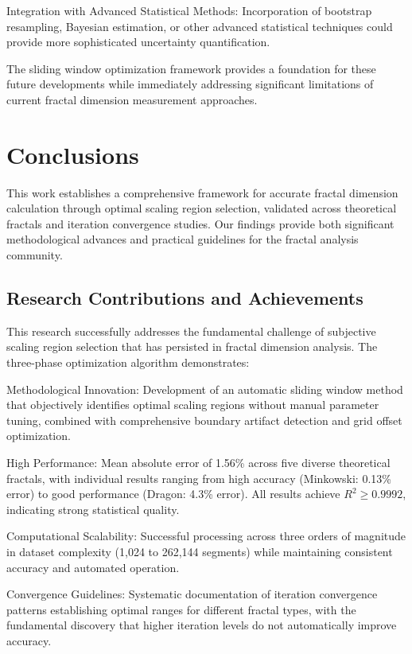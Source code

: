 \documentclass[preprint,12pt]{elsarticle}
\def\textbf#1{#1}%
\begin{document}
\textbf{Integration with Advanced Statistical Methods}: Incorporation of bootstrap resampling, Bayesian estimation, or other advanced statistical techniques could provide more sophisticated uncertainty quantification.

The sliding window optimization framework provides a foundation for these future developments while immediately addressing significant limitations of current fractal dimension measurement approaches.

\section{Conclusions}
\label{sec:conclusions}

This work establishes a comprehensive framework for accurate fractal dimension calculation through optimal scaling region selection, validated across theoretical fractals and iteration convergence studies. Our findings provide both significant methodological advances and practical guidelines for the fractal analysis community.

\subsection{Research Contributions and Achievements}

This research successfully addresses the fundamental challenge of subjective scaling region selection that has persisted in fractal dimension analysis. The three-phase optimization algorithm demonstrates:

\textbf{Methodological Innovation}: Development of an automatic sliding window method that objectively identifies optimal scaling regions without manual parameter tuning, combined with comprehensive boundary artifact detection and grid offset optimization.

\textbf{High Performance}: Mean absolute error of 1.56\% across five diverse theoretical fractals, with individual results ranging from high accuracy (Minkowski: 0.13\% error) to good performance (Dragon: 4.3\% error). All results achieve $R^2 \geq 0.9992$, indicating strong statistical quality.

\textbf{Computational Scalability}: Successful processing across three orders of magnitude in dataset complexity (1,024 to 262,144 segments) while maintaining consistent accuracy and automated operation.

\textbf{Convergence Guidelines}: Systematic documentation of iteration convergence patterns establishing optimal ranges for different fractal types, with the fundamental discovery that higher iteration levels do not automatically improve accuracy.
\end{document}

